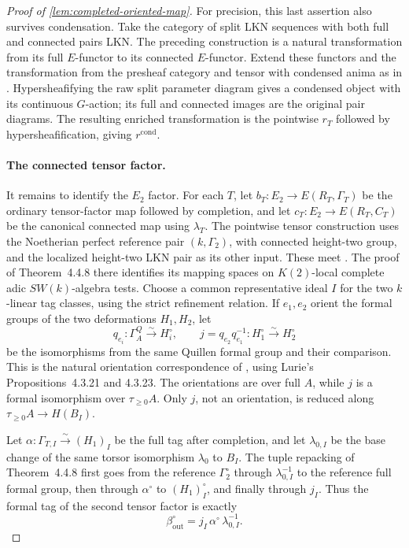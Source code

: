 \begin{proof}[Proof of \cref{lem:completed-oriented-map}]
For precision, this last assertion also survives condensation. Take the
category of split LKN sequences with both full and connected pairs LKN.
The preceding construction is a natural transformation from its full
\(E\)-functor to its connected \(E\)-functor. Extend these functors and
the transformation from the presheaf category and tensor with condensed
anima as in \cite[Construction~4.5.2]{BMR2026}. Hypersheafifying the raw
split parameter diagram gives a condensed object with its continuous
\(G\)-action; its full and connected images are the original pair
diagrams. The resulting enriched transformation is the pointwise \(r_T\)
followed by hypersheafification, giving \(r^{\mathrm{cond}}\).

\paragraph{The connected tensor factor.}
It remains to identify the \(E_2\) factor. For each \(T\), let
\(b_T:E_2\to E(R_T,\Gamma_T)\) be the ordinary tensor-factor map followed
by completion, and let \(c_T:E_2\to E(R_T,C_T)\) be the canonical
connected map using \(\lambda_T\). The pointwise tensor construction uses
the Noetherian perfect reference pair \((k,\Gamma_2)\), with connected
height-two group, and the localized height-two LKN pair as its other
input. These meet \cite[Construction~4.4.7]{BMR2026}. The proof of
Theorem~4.4.8 there identifies its mapping spaces on \(K(2)\)-local
complete adic \(SW(k)\)-algebra tests. Choose a common representative
ideal \(I\) for the two \(k\)-linear tag classes, using the strict
refinement relation. If \(e_1,e_2\) orient the formal groups of the two
deformations \(H_1,H_2\), let
\[
 q_{e_i}:\Gamma_A^{Q}\xrightarrow{\sim}H_i^\circ,\qquad
 j=q_{e_2}q_{e_1}^{-1}:H_1^\circ\xrightarrow{\sim}H_2^\circ
\]
be the isomorphisms from the same Quillen formal group and their
comparison. This is the natural orientation correspondence of
\cite[Remark~4.1.18]{BMR2026}, using Lurie's Propositions~4.3.21 and
4.3.23. The orientations are over full \(A\), while \(j\) is a formal
isomorphism over \(\tau_{\geq0}A\). Only \(j\), not an orientation, is
reduced along \(\tau_{\geq0}A\to H(B_I)\).

Let \(\alpha:\Gamma_{T,I}\xrightarrow{\sim}(H_1)_I\) be the full tag
after completion, and let \(\lambda_{0,I}\) be the base change of the
same torsor isomorphism \(\lambda_0\) to \(B_I\). The tuple repacking of
Theorem~4.4.8 first goes from the reference \(\Gamma_2^\circ\) through
\(\lambda_{0,I}^{-1}\) to the reference full formal group, then through
\(\alpha^\circ\) to \((H_1)_I^\circ\), and finally through \(j_I\).
Thus the formal tag of the second tensor factor is exactly
\[
 \beta_{\mathrm{out}}^\circ
   =j_I\,\alpha^\circ\,\lambda_{0,I}^{-1}.
\]


\end{proof}
